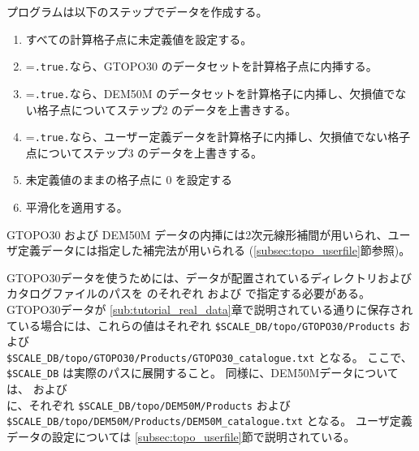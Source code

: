 プログラムは以下のステップでデータを作成する。
\begin{enumerate}[1)]
 \item すべての計算格子点に未定義値を設定する。
 \item {}=\verb|.true.|なら、GTOPO30 のデータセットを計算格子点に内挿する。
 \item {}=\verb|.true.|なら、DEM50M のデータセットを計算格子に内挿し、欠損値でない格子点についてステップ2 のデータを上書きする。
 \item {}=\verb|.true.|なら、ユーザー定義データを計算格子に内挿し、欠損値でない格子点についてステップ3 のデータを上書きする。
 \item 未定義値のままの格子点に 0 を設定する
 \item 平滑化を適用する。
\end{enumerate}
GTOPO30 および DEM50M データの内挿には2次元線形補間が用いられ、ユーザ定義データには指定した補完法が用いられる (\ref{subsec:topo_userfile}節参照)。

GTOPO30データを使うためには、データが配置されているディレクトリおよびカタログファイルのパスを  のそれぞれ  および  で指定する必要がある。
GTOPO30データが \ref{sub:tutorial_real_data}章で説明されている通りに保存されている場合には、これらの値はそれぞれ \verb|$SCALE_DB/topo/GTOPO30/Products| および \\ \verb|$SCALE_DB/topo/GTOPO30/Products/GTOPO30_catalogue.txt| となる。
ここで、\verb|$SCALE_DB| は実際のパスに展開すること。
同様に、DEM50Mデータについては、 および \\  に、それぞれ \verb|$SCALE_DB/topo/DEM50M/Products| および \\ \verb|$SCALE_DB/topo/DEM50M/Products/DEM50M_catalogue.txt| となる。
ユーザ定義データの設定については \ref{subsec:topo_userfile}節で説明されている。


